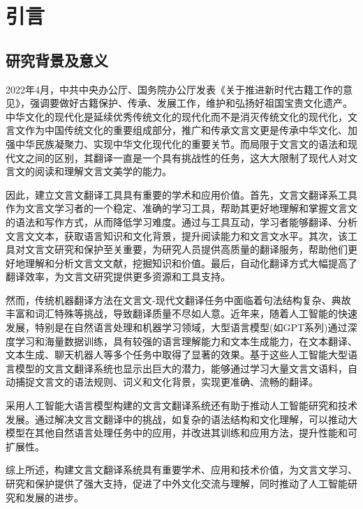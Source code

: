 \documentclass[
    decl-page,  %
    ,fontset = win, %
  ]{njuthesis}
\begin{document}
%   
%   

\chapter{引言}

\section{研究背景及意义}

2022年4月，中共中央办公厅、国务院办公厅发表《关于推进新时代古籍工作的意见》，强调要做好古籍保护、传承、发展工作，维护和弘扬好祖国宝贵文化遗产\cite{XYDU202403001}。中华文化的现代化是延续优秀传统文化的现代化而不是消灭传统文化的现代化，文言文作为中国传统文化的重要组成部分，推广和传承文言文更是传承中华文化、加强中华民族凝聚力、实现中华文化现代化的重要关节。而局限于文言文的语法和现代文之间的区别，其翻译一直是一个具有挑战性的任务，这大大限制了现代人对文言文的阅读和理解文言文美学的能力。

因此，建立文言文翻译工具具有重要的学术和应用价值。首先，文言文翻译系工具作为文言文学习者的一个稳定、准确的学习工具，帮助其更好地理解和掌握文言文的语法和写作方式，从而降低学习难度。通过与工具互动，学习者能够翻译、分析文言文文本，获取语言知识和文化背景，提升阅读能力和文言文水平。其次，该工具对文言文研究和保护至关重要，为研究人员提供高质量的翻译服务，帮助他们更好地理解和分析文言文文献，挖掘知识和价值。最后，自动化翻译方式大幅提高了翻译效率，为文言文研究提供更多资源和工具支持。

然而，传统机器翻译方法在文言文-现代文翻译任务中面临着句法结构复杂、典故丰富和词汇特殊等挑战，导致翻译质量不尽如人意。近年来，随着人工智能的快速发展，特别是在自然语言处理和机器学习领域，大型语言模型(如GPT系列)通过深度学习和海量数据训练，具有较强的语言理解能力和文本生成能力，在文本翻译、文本生成、聊天机器人等多个任务中取得了显著的效果。基于这些人工智能大型语言模型的文言文翻译系统也显示出巨大的潜力，能够通过学习大量文言文语料，自动捕捉文言文的语法规则、词义和文化背景，实现更准确、流畅的翻译。

采用人工智能大语言模型构建的文言文翻译系统还有助于推动人工智能研究和技术发展。通过解决文言文翻译中的挑战，如复杂的语法结构和文化理解，可以推动大模型在其他自然语言处理任务中的应用，并改进其训练和应用方法，提升性能和可扩展性。

综上所述，构建文言文翻译系统具有重要学术、应用和技术价值，为文言文学习、研究和保护提供了强大支持，促进了中外文化交流与理解，同时推动了人工智能研究和发展的进步。
\end{document}
